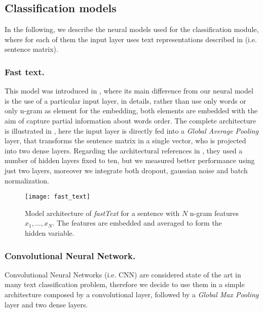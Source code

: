 \subsection{Classification models} \label{subsec:classificationModel}
In the following, we describe the neural models used for the classification module, where for each of them the input layer uses text representations described in  (i.e. sentence matrix).


\subsubsection{Fast text.}
This model was introduced in \cite{joulin2016bag}, where its main difference from our neural model is the use of a particular input layer, in details, rather than use only words or only n-gram as element for the embedding, both elements are embedded with the aim of capture partial information about words order.
The complete architecture is illustrated in , here the input layer is directly fed into a \emph{Global Average Pooling} layer, that transforms the sentence matrix in a single vector, who is projected into two dense layers.
Regarding the architectural references in \cite{joulin2016bag}, they used a number of hidden layers fixed to ten, but we measured better performance using just two layers, moreover we integrate both dropout, gaussian noise and batch normalization.

\begin{figure}[h]
\footnotesize
\centering
\texttt{[image: fast\_text]}
\caption{\cite{joulin2016bag} Model architecture of \emph{fastText} for a sentence with $N$ n-gram features $x_1,\dots,x_N$. The features are embedded and averaged to form the hidden variable.}
\label{fig:fastText}
\end{figure}


\subsubsection{Convolutional Neural Network.}
Convolutional Neural Networks (i.e. CNN) are considered state of the art in many text classification problem, therefore we decide to use them in a simple architecture composed by a convolutional layer, followed by a \emph{Global Max Pooling} layer and two dense layers.

